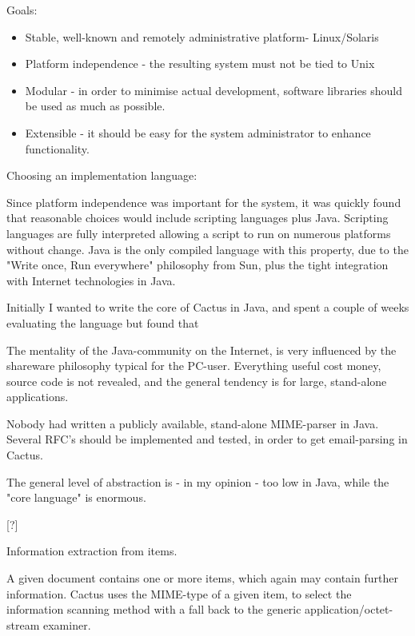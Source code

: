 Goals:

\begin{itemize}
\item Stable, well-known and remotely administrative
  platform- Linux/Solaris
\item Platform independence - the resulting system must not
  be tied to Unix
 
\item Modular - in order to minimise actual development,
  software libraries should be used as much as possible.
  
\item Extensible - it should be easy for the system
  administrator to enhance functionality.
\end{itemize}

Choosing an implementation language:
\label{sec:cactus-choice-of-language}

Since platform independence was important for the system, it
was quickly found that reasonable choices would include
scripting languages plus Java.  Scripting languages are
fully interpreted allowing a script to run on numerous
platforms without change.  Java is the only compiled
language with this property, due to the "Write once, Run
everywhere" philosophy from Sun, plus the tight integration
with Internet technologies in Java.

Initially I wanted to write the core of Cactus in Java, and
spent a couple of weeks evaluating the language but found
that


The mentality of the Java-community on the Internet, is very
influenced by the shareware philosophy typical for the
PC-user.  Everything useful cost money, source code is not
revealed, and the general tendency is for large, stand-alone
applications.

Nobody had written a publicly available, stand-alone
MIME-parser in Java.  Several RFC's should be implemented
and tested, in order to get email-parsing in Cactus.

The general level of abstraction is - in my opinion - too
low in Java, while the "core language" is enormous.



[?]



Information extraction from items.



A given document contains one or more items, which again may
contain further information.  Cactus uses the MIME-type of a
given item, to select the information scanning method with a
fall back to the generic application/octet-stream examiner.


